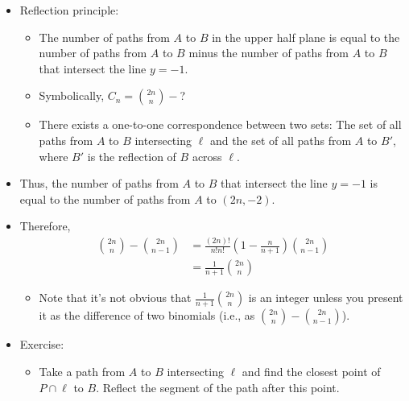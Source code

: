 \documentclass[../apprentice.tex]{subfiles}
\begin{document}
\begin{itemize}
\begin{itemize}
    \end{itemize}
    \item Reflection principle:
    \begin{itemize}
        \item The number of paths from $A$ to $B$ in the upper half plane is equal to the number of paths from $A$ to $B$ minus the number of paths from $A$ to $B$ that intersect the line $y=-1$.
        \item Symbolically, $C_n=\binom{2n}{n}-$?
        \item There exists a one-to-one correspondence between two sets: The set of all paths from $A$ to $B$ intersecting $\ell$ and the set of all paths from $A$ to $B'$, where $B'$ is the reflection of $B$ across $\ell$.
    \end{itemize}
    \item Thus, the number of paths from $A$ to $B$ that intersect the line $y=-1$ is equal to the number of paths from $A$ to $(2n,-2)$.
    \item Therefore,
    \begin{align*}
        \binom{2n}{n}-\binom{2n}{n-1} &= \frac{(2n)!}{n!n!}\left( 1-\frac{n}{n+1} \right)\binom{2n}{n-1}\\
        &= \frac{1}{n+1}\binom{2n}{n}
    \end{align*}
    \begin{itemize}
        \item Note that it's not obvious that $\frac{1}{n+1}\binom{2n}{n}$ is an integer unless you present it as the difference of two binomials (i.e., as $\binom{2n}{n}-\binom{2n}{n-1}$).
    \end{itemize}
    \item Exercise:
    \begin{itemize}
        \item Take a path from $A$ to $B$ intersecting $\ell$ and find the closest point of $P\cap\ell$ to $B$. Reflect the segment of the path after this point.
    \end{itemize}
\end{itemize}
\end{document}
